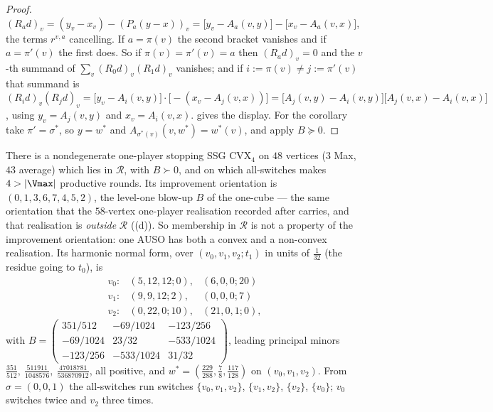 \begin{proof}
$(R_ad)_v=(y_v-x_v)-(P_a(y-x))_v=\bigl[y_v-A_a(v,y)\bigr]-\bigl[x_v-A_a(v,x)\bigr]$,
the terms $r^{v,a}$ cancelling. If $a=\pi(v)$ the second bracket vanishes
and if $a=\pi'(v)$ the first does. So if $\pi(v)=\pi'(v)=a$ then
$(R_ad)_v=0$ and the $v$-th summand of $\sum_v(R_0d)_v(R_1d)_v$ vanishes;
and if $i:=\pi(v)\ne j:=\pi'(v)$ that summand is
$(R_id)_v(R_jd)_v=\bigl[y_v-A_i(v,y)\bigr]\cdot\bigl[-(x_v-A_j(v,x))\bigr]
=\bigl[A_j(v,y)-A_i(v,y)\bigr]\bigl[A_j(v,x)-A_i(v,x)\bigr]$, using
$y_v=A_j(v,y)$ and $x_v=A_i(v,x)$.  gives the display. For
the corollary take $\pi'=\sigma^{\ast}$, so $y=w^{\ast}$ and
$A_{\sigma^\ast(v)}(v,w^\ast)=w^\ast(v)$, and apply $B\succeq0$.
\end{proof}

\begin{proposition}\label{vr:convex-long}
There is a nondegenerate one-player stopping SSG $\mathrm{CVX}_4$ on $48$
vertices ($3$ Max, $43$ average) which lies in $\mathcal R$, with
$B\succ0$, and on which all-switches makes $4>|\Vmax|$ productive rounds.
Its improvement orientation is $(0,1,3,6,7,4,5,2)$, the level-one blow-up
$B$ of the one-cube --- the same orientation that the $58$-vertex
one-player realisation recorded after  carries,
and that realisation is \emph{outside} $\mathcal R$
((d)). So membership in $\mathcal R$ is not a property of
the improvement orientation: one AUSO has both a convex and a non-convex
realisation. Its harmonic normal
form, over $(v_0,v_1,v_2;t_1)$ in units of $\tfrac1{32}$ (the residue going
to $t_0$), is
\[
  \begin{array}{lll}
   v_0:&(5,12,12;0),&(6,0,0;20)\\
   v_1:&(9,9,12;2),&(0,0,0;7)\\
   v_2:&(0,22,0;10),&(21,0,1;0),
  \end{array}
\]
with
$B=\begin{pmatrix}351/512&-69/1024&-123/256\\-69/1024&23/32&-533/1024\\
-123/256&-533/1024&31/32\end{pmatrix}$,
leading principal minors $\tfrac{351}{512},\ \tfrac{511911}{1048576},\
\tfrac{47018781}{536870912}$, all positive, and
$w^{\ast}=(\tfrac{229}{288},\tfrac78,\tfrac{117}{128})$ on
$(v_0,v_1,v_2)$. From $\sigma=(0,0,1)$ the all-switches run switches
$\{v_0,v_1,v_2\}$, $\{v_1,v_2\}$, $\{v_2\}$, $\{v_0\}$; $v_0$ switches
twice and $v_2$ three times.
\end{proposition}


